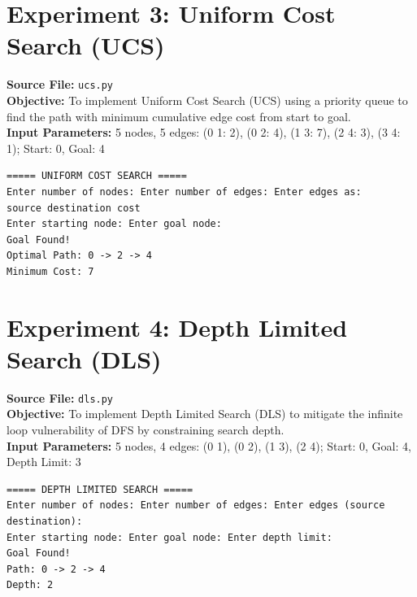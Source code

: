 \documentclass[11pt,a4paper]{article}
\begin{document}
\section{Experiment 3: Uniform Cost Search (UCS)}
\textbf{Source File:} \texttt{ucs.py} \\[4pt]
\textbf{Objective:} To implement Uniform Cost Search (UCS) using a priority queue to find the path with minimum cumulative edge cost from start to goal. \\[4pt]
\textbf{Input Parameters:} 5 nodes, 5 edges: (0 1: 2), (0 2: 4), (1 3: 7), (2 4: 3), (3 4: 1); Start: 0, Goal: 4 \\[6pt]
\begin{tcolorbox}[colback=gray!5!white,colframe=blue!70!black,title={\textbf{Program Output: Uniform Cost Search (UCS)}}]
\begin{verbatim}
===== UNIFORM COST SEARCH =====
Enter number of nodes: Enter number of edges: Enter edges as:
source destination cost
Enter starting node: Enter goal node: 
Goal Found!
Optimal Path: 0 -> 2 -> 4
Minimum Cost: 7
\end{verbatim}
\end{tcolorbox}
\vspace{1em}

\section{Experiment 4: Depth Limited Search (DLS)}
\textbf{Source File:} \texttt{dls.py} \\[4pt]
\textbf{Objective:} To implement Depth Limited Search (DLS) to mitigate the infinite loop vulnerability of DFS by constraining search depth. \\[4pt]
\textbf{Input Parameters:} 5 nodes, 4 edges: (0 1), (0 2), (1 3), (2 4); Start: 0, Goal: 4, Depth Limit: 3 \\[6pt]
\begin{tcolorbox}[colback=gray!5!white,colframe=blue!70!black,title={\textbf{Program Output: Depth Limited Search (DLS)}}]
\begin{verbatim}
===== DEPTH LIMITED SEARCH =====
Enter number of nodes: Enter number of edges: Enter edges (source destination):
Enter starting node: Enter goal node: Enter depth limit: 
Goal Found!
Path: 0 -> 2 -> 4
Depth: 2
\end{verbatim}
\end{tcolorbox}
\vspace{1em}
\end{document}

